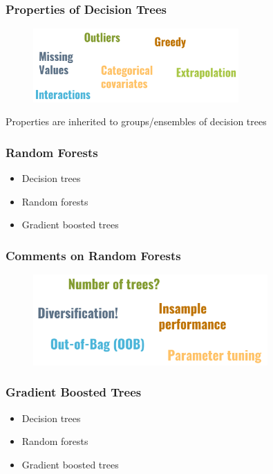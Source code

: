 \documentclass[
    utf8,
    aspectratio=169
]{beamer}  %
\begin{document}
\begin{frame}
\frametitle{Properties of Decision Trees}
\begin{figure}
	\includegraphics[width=0.7\textwidth]{pics/tree_words.png}
\end{figure}

\vfill

Properties are inherited to groups/ensembles of decision trees
\end{frame}

\begin{frame}
	\frametitle{Random Forests}
	\begin{itemize}
		\item Decision trees
		\item Random forests
		\item Gradient boosted trees
	\end{itemize}
\end{frame}

\begin{frame}
	\frametitle{Comments on Random Forests}
	\begin{figure}
		\includegraphics[width=0.8\textwidth]{pics/rf_words.png}
	\end{figure}
	\begin{example}
	\end{example}
\end{frame}



\begin{frame}
	\frametitle{Gradient Boosted Trees}
	\begin{itemize}
		\item Decision trees
		\item Random forests
		\item Gradient boosted trees
	\end{itemize}
\end{frame}
\end{document}
